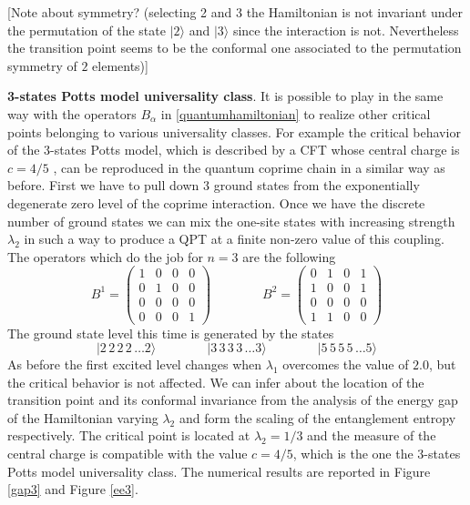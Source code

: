 \documentclass[aps,pra,superscriptaddress]{revtex4}
\newcommand\be            {\begin{equation}}
\newcommand\ee            {\end{equation}}
\renewcommand{\(}{\left(}
\renewcommand{\)}{\right)}
\renewcommand{\[}{\left[}
\renewcommand{\]}{\right]}
\newcommand\ket[1]{|#1\rangle}
\begin{document}
[Note about symmetry? (selecting 2 and 3 the Hamiltonian is not invariant under the permutation of the state $\ket{2}$ and $\ket{3}$ since the interaction is not. Nevertheless the transition point seems to be the conformal one associated to the permutation symmetry of $2$ elements)] 

\vspace{3mm}
\noindent 
{\bf 3-states Potts model universality class}. It is possible to play in the same way with the operators $B_\alpha$ in \eqref{quantumhamiltonian} to realize other critical points belonging to various universality classes. For example the critical behavior of the $3$-states Potts model, which is described by a CFT whose central charge is $c=4/5$ \cite{dots}, can be reproduced in the quantum coprime chain in a similar way as before. First we have to pull down $3$ ground states from the exponentially degenerate zero level of the coprime interaction. Once we have the discrete number of ground states we can mix the one-site states with increasing strength $\lambda_2$ in such a way to produce a QPT at a finite non-zero value of this coupling. The operators which do the job for $n=3$ are the following
\be 
B^1 = 
\begin{pmatrix}
1 & 0 & 0 & 0 \\
0 & 1 & 0 & 0 \\
0 & 0 & 0 & 0 \\
0 & 0 & 0 & 1 
\end{pmatrix}
\qquad
\qquad
B^2 = 
\begin{pmatrix}
0 & 1 & 0 & 1 \\
1 & 0 & 0 & 1 \\
0 & 0 & 0 & 0 \\
1 & 1 & 0 & 0 
\end{pmatrix}
\ee
The ground state level this time is generated by the states
\be \label{inertgs}
\ket{2\,2\,2\,2\,\dots 2}
\qquad \qquad
\ket{3\,3\,3\,3\,\dots 3}
\qquad \qquad
\ket{5\,5\,5\,5\, \dots 5}
\ee
As before the first excited level changes when $\lambda_1$ overcomes the value of $2.0$, but the critical behavior is not affected. We can infer about the location of the transition point and its conformal invariance from the analysis of the energy gap of the Hamiltonian varying $\lambda_2$ and form the scaling of the entanglement entropy respectively. The critical point is located at $\lambda_2 = 1/3$ and the measure of the central charge is compatible with the value $c=4/5$, which is the one the $3$-states Potts model universality class. The numerical results are reported in Figure \ref{gap3} and Figure \ref{ee3}.
\end{document}
